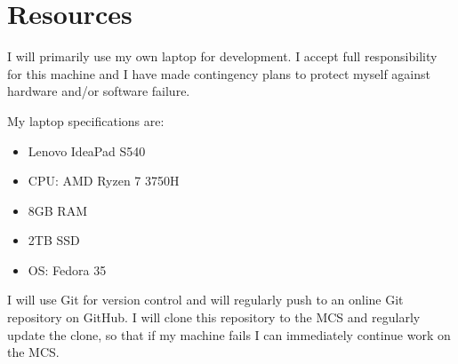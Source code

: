 \documentclass[12pt,a4paper]{article}
\begin{document}
\section*{Resources}

I will primarily use my own laptop for development. I accept full responsibility for this machine and I have made contingency plans to protect myself against hardware and/or software failure.

My laptop specifications are:
\begin{itemize}
\item Lenovo IdeaPad S540
\item CPU: AMD Ryzen 7 3750H
\item 8GB RAM
\item 2TB SSD
\item OS: Fedora 35
\end{itemize}

I will use Git for version control and will regularly push to an online Git repository on GitHub. I will clone this repository to the MCS and regularly update the clone, so that if my machine fails I can immediately continue work on the MCS.
\end{document}
